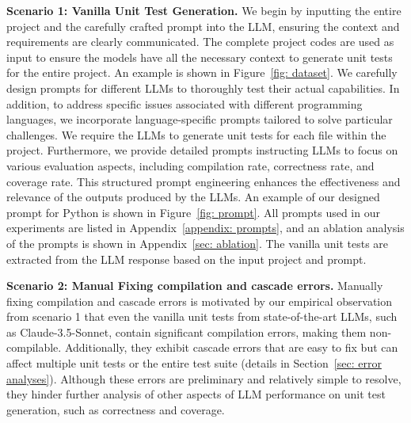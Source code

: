 
\noindent\textbf{Scenario 1: Vanilla Unit Test Generation. }
We begin by inputting the entire project and the carefully crafted prompt into the LLM, ensuring the context and requirements are clearly communicated. 
The complete project codes are used as input to ensure the models have all the necessary context to generate unit tests for the entire project. An example is shown in Figure~\ref{fig: dataset}. 
We carefully design prompts for different LLMs to thoroughly test their actual capabilities. 
In addition, to address specific issues associated with different programming languages, we incorporate language-specific prompts tailored to solve particular challenges.
We require the LLMs to generate unit tests for each file within the project. 
Furthermore, we provide detailed prompts instructing LLMs to focus on various evaluation aspects, including compilation rate, correctness rate, and coverage rate. 
This structured prompt engineering enhances the effectiveness and relevance of the outputs produced by the LLMs.
An example of our designed prompt for Python is shown in Figure~\ref{fig: prompt}.
All prompts used in our experiments are listed in Appendix~\ref{appendix: prompts}, and an ablation analysis of the prompts is shown in Appendix~\ref{sec: ablation}.
The vanilla unit tests are extracted from the LLM response based on the input project and prompt. 


\noindent\textbf{Scenario 2: Manual Fixing compilation and cascade errors. } Manually fixing compilation and cascade errors is motivated by our empirical observation from scenario 1 that even the vanilla unit tests from state-of-the-art LLMs, such as Claude-3.5-Sonnet, contain significant compilation errors, making them non-compilable. Additionally, they exhibit cascade errors that are easy to fix but can affect multiple unit tests or the entire test suite (details in Section~\ref{sec: error analyses}). Although these errors are preliminary and relatively simple to resolve, they hinder further analysis of other aspects of LLM performance on unit test generation, such as correctness and coverage.


